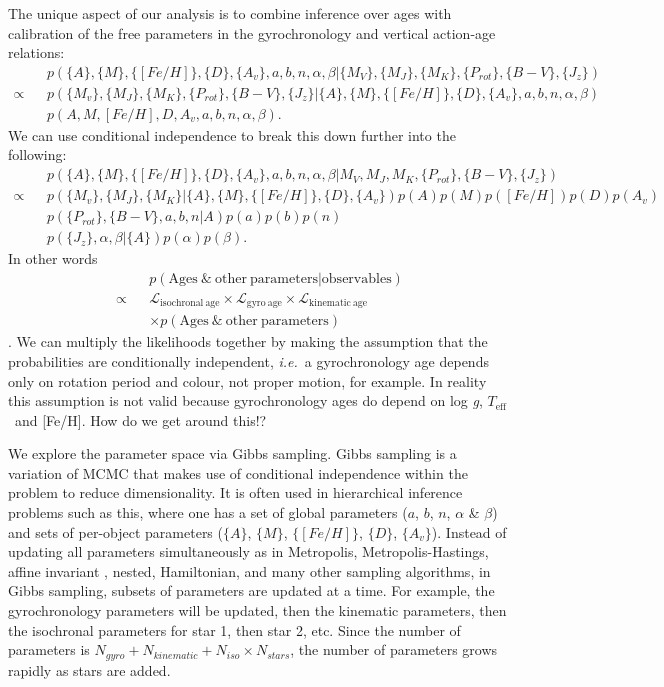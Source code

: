 \documentclass[useAMS, usenatbib, preprint, 12pt]{aastex}
\newcommand{\racomment}[1]{{\color{red}#1}}
\newcommand{\teff}{$T_{\mathrm{eff}}$}
\newcommand{\feh}{[Fe/H]}
\newcommand{\logg}{log \emph{g}}
\newcommand{\ie}{{\it i.e.}}
\begin{document}
The unique aspect of our analysis is to combine inference over ages with
calibration of the free parameters in the gyrochronology and vertical
action-age relations:
\begin{eqnarray}
    &&p(\{A\}, \{M\}, \{[Fe/H]\}, \{D\}, \{A_v\}, a, b, n, \alpha, \beta|
    \{M_V\}, \{M_J\}, \{M_K\}, \{P_{rot}\}, \{B-V\}, \{J_z\}) \\ \nonumber
    \propto &&p(\{M_v\}, \{M_J\}, \{M_K\}, \{P_{rot}\},
    \{B-V\}, \{J_z\} | \{A\}, \{M\}, \{[Fe/H]\}, \{D\}, \{A_v\}, a, b, n,
    \alpha, \beta) \\ \nonumber
    &&p(A, M, [Fe/H], D, A_v, a, b, n, \alpha, \beta).
\end{eqnarray}
We can use conditional independence to break this down further into the
following:
\begin{eqnarray}
    &&p(\{A\}, \{M\}, \{[Fe/H]\}, \{D\}, \{A_v\}, a, b, n, \alpha, \beta|
    M_V, M_J, M_K,
    \{P_{rot}\}, \{B-V\}, \{J_z\}) \\  \nonumber
    \propto &&p(\{M_v\}, \{M_J\}, \{M_K\} | \{A\}, \{M\}, \{[Fe/H]\}, \{D\},
    \{A_v\})
    p(A)p(M)p([Fe/H])p(D)p(A_v) \\ \nonumber
    &&p(\{P_{rot}\}, \{B-V\}, a, b, n | A)p(a)p(b)p(n) \\ \nonumber
    &&p(\{J_z\}, \alpha, \beta | \{A\}) p(\alpha)p(\beta).
\end{eqnarray}
In other words
\begin{eqnarray}
    &&p(\mathrm{Ages~\&~other~parameters}|\mathrm{observables}) \\
    \propto &&\mathcal{L}_{\mathrm{isochronal~age}} \times
    \mathcal{L}_{\mathrm{gyro~age}} \times
    \mathcal{L}_{\mathrm{kinematic~age}} \\
    && \times p(\mathrm{Ages~\&~other~parameters})
\end{eqnarray}.
We can multiply the likelihoods together by making the assumption that the
probabilities are conditionally independent, \ie\ a gyrochronology age depends
only on rotation period and colour, not proper motion, for example.
In reality this assumption is not valid because gyrochronology ages do depend
on \logg, \teff\ and \feh.
\racomment{How do we get around this!?}

We explore the parameter space via Gibbs sampling.
Gibbs sampling is a variation of MCMC that makes use of conditional
independence within the problem to reduce dimensionality.
It is often used in hierarchical inference problems such as this, where one
has a set of global parameters ($a$, $b$, $n$, $\alpha$ \& $\beta$) and sets
of per-object parameters ($\{A\}$, $\{M\}$, $\{[Fe/H]\}$, $\{D\}$, $\{A_v\}$).
Instead of updating all parameters simultaneously as in Metropolis,
Metropolis-Hastings, affine invariant \citep{Goodman2010}, nested, Hamiltonian,
and many other sampling algorithms, in Gibbs sampling, subsets of parameters
are updated at a time.
For example, the gyrochronology parameters will be updated, then the kinematic
parameters, then the isochronal parameters for star 1, then star 2, etc.
Since the number of parameters is $N_{gyro} + N_{kinematic} + N_{iso} \times
N_{stars}$, the number of parameters grows rapidly as stars are added.
\end{document}
